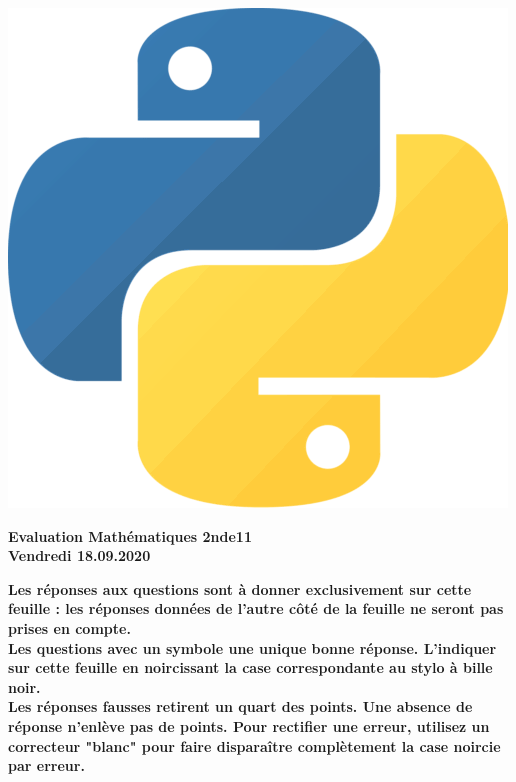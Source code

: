 \documentclass[a4paper]{article}
\begin{document}
{{\begin{center}
\includegraphics[scale=0.2]{../python.png} 
\end{center}


\clearpage
\AMCdebutFormulaire

\begin{minipage}{.4\linewidth}
\centering\large\bf Evaluation Mathématiques 2nde11\\Vendredi 18.09.2020 \end{minipage}

\begin{center}
\bf Les réponses aux questions sont à donner exclusivement sur cette feuille : 
les réponses données de l'autre côté de la feuille ne seront pas prises en compte.
\\
Les questions avec un symbole  une unique bonne réponse. L'indiquer sur cette feuille en noircissant la case correspondante au stylo à bille noir.\\
Les réponses fausses retirent un quart des points. Une absence de réponse n'enlève pas de points.
Pour rectifier une erreur, utilisez un correcteur "blanc" pour faire disparaître complètement la case noircie par erreur.\\
\
\end{center}
\formulaire

\AMCcleardoublepage

}
}
\end{document}
